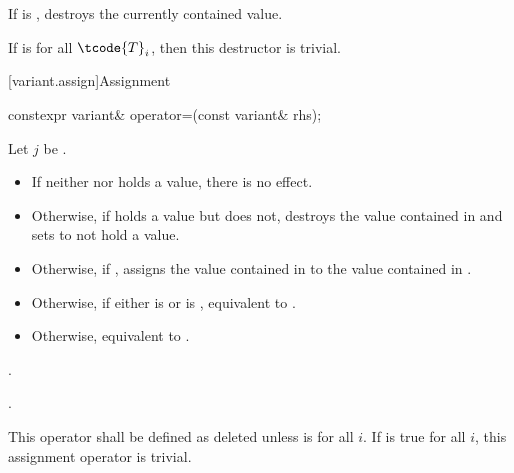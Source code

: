 \begin{itemdescr}
\pnum
\effects
If  is ,
destroys the currently contained value.

\pnum
\remarks
If  is  for all $\tcode{T}_i$,
then this destructor is trivial.
\end{itemdescr}

[variant.assign]{Assignment}

%
\begin{itemdecl}
constexpr variant& operator=(const variant& rhs);
\end{itemdecl}

\begin{itemdescr}
\pnum
Let $j$ be .

\pnum
\effects
\begin{itemize}
\item
If neither  nor  holds a value, there is no effect.
\item
Otherwise, if  holds a value but  does not, destroys the value
contained in  and sets  to not hold a value.
\item
Otherwise, if , assigns the value contained in 
to the value contained in .
\item
Otherwise, if either 
is  or
 is ,
equivalent to .
\item
Otherwise, equivalent to .
\end{itemize}

\pnum
\returns {}.

\pnum
\ensures {}.

\pnum
\remarks
This operator shall be defined as deleted unless
is  for all $i$.
If 
is true for all $i$, this assignment operator is trivial.
\end{itemdescr}

